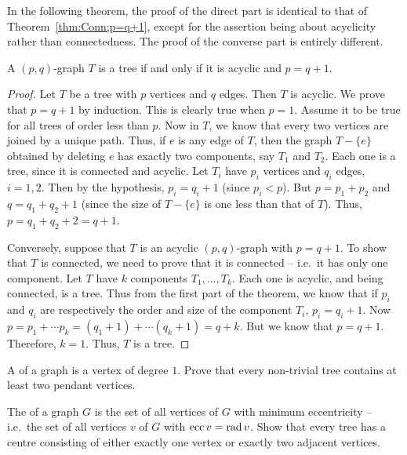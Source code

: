 In the following theorem, the proof of the direct part is identical to that of Theorem~\ref{thm:Conn;p=q+1}, except for the assertion being about acyclicity rather than connectedness. The proof of the converse part is entirely different.
\begin{Theorem}\label{thm:Acyc;p=q+1}
A $(p,q)$-graph $T$ is a tree if and only if it is acyclic and $p = q + 1$.
\end{Theorem}
\begin{proof}
Let $T$ be a tree with $p$ vertices and $q$ edges. Then $T$ is acyclic. We prove that $p = q + 1$ by induction. This is clearly true when $p = 1$. Assume it to be true for all trees of order less than $p$. Now in $T$, we know that every two vertices are joined by a unique path. Thus, if $e$ is any edge of $T$, then the graph $T - \{e\}$ obtained by deleting $e$ has exactly two components, say $T_1$ and $T_2$. Each one is a tree, since it is connected and acyclic. Let $T_i$ have $p_i$ vertices and $q_i$ edges, $i = 1, 2$. Then by the hypothesis, $p_i = q_i + 1$ (since $p_i < p$). But $p = p_1 + p_2$ and $q = q_1 + q_2 + 1$ (since the size of $T - \{e\}$ is one less than that of $T$). Thus, $p = q_1 + q_2 + 2 = q + 1$.

Conversely, suppose that $T$ is an acyclic $(p,q)$-graph with $p = q + 1$. To show that $T$ is connected, we need to prove that it is connected -- i.e.\ it has only one component. Let $T$ have $k$ components $T_1, \ldots, T_k$. Each one is acyclic, and being connected, is a tree. Thus from the first part of the theorem, we know that if $p_i$ and $q_i$ are respectively the order and size of the component $T_i$, $p_i = q_i + 1$. Now $p = p_1 + \cdots p_k = (q_1 + 1) + \cdots (q_k + 1) = q + k$. But we know that $p = q + 1$. Therefore, $k = 1$. Thus, $T$ is a tree.
\end{proof}

\begin{Exercise}
A  of a graph is a vertex of degree $1$. Prove that every non-trivial tree contains at least two pendant vertices.\\
\end{Exercise}

\begin{Exercise}
The  of a graph $G$ is the set of all vertices of $G$ with minimum eccentricity -- i.e.\ the set of all vertices $v$ of $G$ with $\operatorname{ecc} v = \operatorname{rad} v$. Show that every tree has a centre consisting of either exactly one vertex or exactly two adjacent vertices.\\
\end{Exercise}


